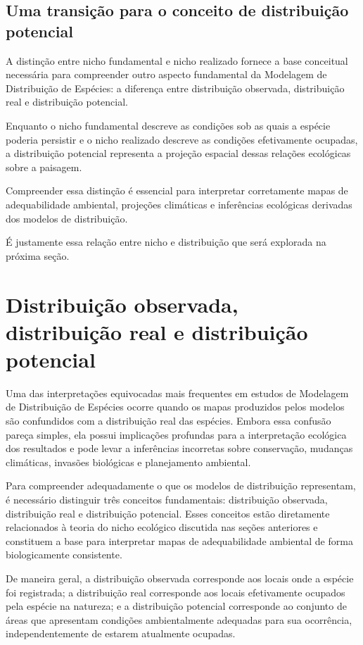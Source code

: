 \subsection{Uma transição para o conceito de distribuição potencial}

A distinção entre nicho fundamental e nicho realizado fornece a base conceitual necessária para compreender outro aspecto fundamental da Modelagem de Distribuição de Espécies: a diferença entre distribuição observada, distribuição real e distribuição potencial.

Enquanto o nicho fundamental descreve as condições sob as quais a espécie poderia persistir e o nicho realizado descreve as condições efetivamente ocupadas, a distribuição potencial representa a projeção espacial dessas relações ecológicas sobre a paisagem.

Compreender essa distinção é essencial para interpretar corretamente mapas de adequabilidade ambiental, projeções climáticas e inferências ecológicas derivadas dos modelos de distribuição.

É justamente essa relação entre nicho e distribuição que será explorada na próxima seção.

\section{Distribuição observada, distribuição real e distribuição potencial}

Uma das interpretações equivocadas mais frequentes em estudos de Modelagem de Distribuição de Espécies ocorre quando os mapas produzidos pelos modelos são confundidos com a distribuição real das espécies. Embora essa confusão pareça simples, ela possui implicações profundas para a interpretação ecológica dos resultados e pode levar a inferências incorretas sobre conservação, mudanças climáticas, invasões biológicas e planejamento ambiental.

Para compreender adequadamente o que os modelos de distribuição representam, é necessário distinguir três conceitos fundamentais: distribuição observada, distribuição real e distribuição potencial. Esses conceitos estão diretamente relacionados à teoria do nicho ecológico discutida nas seções anteriores e constituem a base para interpretar mapas de adequabilidade ambiental de forma biologicamente consistente.

De maneira geral, a distribuição observada corresponde aos locais onde a espécie foi registrada; a distribuição real corresponde aos locais efetivamente ocupados pela espécie na natureza; e a distribuição potencial corresponde ao conjunto de áreas que apresentam condições ambientalmente adequadas para sua ocorrência, independentemente de estarem atualmente ocupadas.


